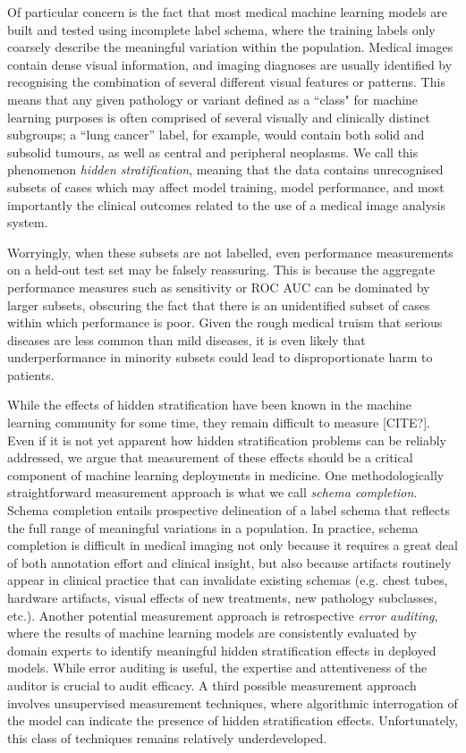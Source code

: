 \documentclass{article}
\begin{document}
Of particular concern is the fact that most medical machine learning models are built and tested using incomplete label schema, where the training labels only coarsely describe the meaningful variation within the population. 
Medical images contain dense visual information, and imaging diagnoses are usually identified by recognising the combination of several different visual features or patterns. 
This means that any given pathology or variant defined as a ``class" for machine learning purposes is often comprised of several visually and clinically distinct subgroups; a ``lung cancer'' label, for example, would contain both solid and subsolid tumours, as well as central and peripheral neoplasms. 
We call this phenomenon \textit{hidden stratification}, meaning that the data contains unrecognised subsets of cases which may affect model training, model performance, and most importantly the clinical outcomes related to the use of a medical image analysis system.  

Worryingly, when these subsets are not labelled, even performance measurements on a held-out test set may be falsely reassuring. 
This is because the aggregate performance measures such as sensitivity or ROC AUC can be dominated by larger subsets, obscuring the fact that there is an unidentified subset of cases within which performance is poor. 
Given the rough medical truism that serious diseases are less common than mild diseases, it is even likely that underperformance in minority subsets could lead to disproportionate harm to patients.

While the effects of hidden stratification have been known in the machine learning community for some time, they remain difficult to measure [CITE?]. 
 Even if it is not yet apparent how hidden stratification problems can be reliably addressed, we argue that measurement of these effects should be a critical component of machine learning deployments in medicine.  
 One methodologically straightforward measurement approach is what we call \textit{schema completion}.  
 Schema completion entails prospective delineation of a label schema that reflects the full range of meaningful variations in a population.  
 In practice, schema completion is difficult in medical imaging not only because it requires a great deal of both annotation effort and clinical insight, but also because artifacts routinely appear in clinical practice that can invalidate existing schemas (e.g. chest tubes, hardware artifacts, visual effects of new treatments, new pathology subclasses, etc.).  
 Another potential measurement approach is retrospective \textit{error auditing}, where the results of machine learning models are consistently evaluated by domain experts to identify meaningful hidden stratification effects in deployed models.  
 While error auditing is useful, the expertise and attentiveness of the auditor is crucial to audit efficacy.  
 A third possible measurement approach involves unsupervised measurement techniques, where algorithmic interrogation of the model can indicate the presence of hidden stratification effects.  Unfortunately, this class of techniques remains relatively underdeveloped.
\end{document}

